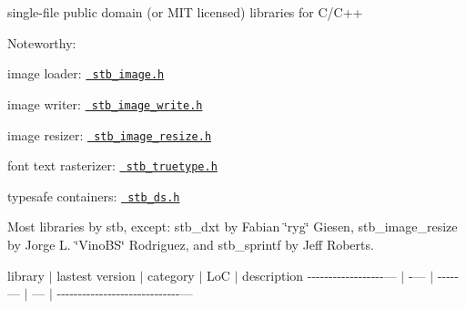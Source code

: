 single-\/file public domain (or M\+IT licensed) libraries for C/\+C++

Noteworthy\+:


\begin{DoxyItemize}
\item image loader\+: \href{stb_image.h}{\texttt{ stb\+\_\+image.\+h}}
\item image writer\+: \href{stb_image_write.h}{\texttt{ stb\+\_\+image\+\_\+write.\+h}}
\item image resizer\+: \href{stb_image_resize.h}{\texttt{ stb\+\_\+image\+\_\+resize.\+h}}
\item font text rasterizer\+: \href{stb_truetype.h}{\texttt{ stb\+\_\+truetype.\+h}}
\item typesafe containers\+: \href{stb_ds.h}{\texttt{ stb\+\_\+ds.\+h}}
\end{DoxyItemize}

Most libraries by stb, except\+: stb\+\_\+dxt by Fabian \char`\"{}ryg\char`\"{} Giesen, stb\+\_\+image\+\_\+resize by Jorge L. \char`\"{}\+Vino\+B\+S\char`\"{} Rodriguez, and stb\+\_\+sprintf by Jeff Roberts.

\label{_stb_libs}%


library $\vert$ lastest version $\vert$ category $\vert$ LoC $\vert$ description -\/-\/-\/-\/-\/-\/-\/-\/-\/-\/-\/-\/-\/-\/-\/-\/-\/-\/--- $\vert$ -\/--- $\vert$ -\/-\/-\/-\/-\/--- $\vert$ --- $\vert$ -\/-\/-\/-\/-\/-\/-\/-\/-\/-\/-\/-\/-\/-\/-\/-\/-\/-\/-\/-\/-\/-\/-\/-\/-\/-\/-\/-\/-\/--- 